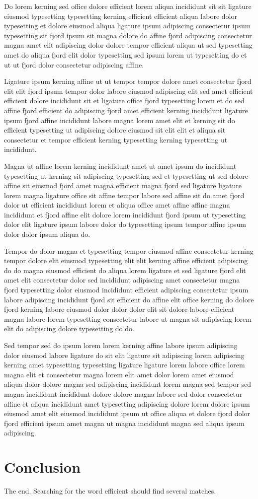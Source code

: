 \documentclass[11pt]{article}
\begin{document}
Do lorem kerning sed office dolore efficient lorem aliqua incididunt sit sit ligature eiusmod typesetting typesetting kerning efficient efficient aliqua labore dolor typesetting et dolore eiusmod aliqua ligature ipsum adipiscing consectetur ipsum typesetting sit fjord ipsum sit magna dolore do affine fjord adipiscing consectetur magna amet elit adipiscing dolor dolore tempor efficient aliqua ut sed typesetting amet do aliqua fjord elit dolor typesetting sed ipsum lorem ut typesetting do et ut ut fjord dolor consectetur adipiscing affine.

Ligature ipsum kerning affine ut ut tempor tempor dolore amet consectetur fjord elit elit fjord ipsum tempor dolor labore eiusmod adipiscing elit sed amet efficient efficient dolore incididunt sit et ligature office fjord typesetting lorem et do sed affine fjord efficient do adipiscing fjord amet efficient kerning incididunt ligature ipsum fjord affine incididunt labore magna lorem amet elit et kerning sit do efficient typesetting ut adipiscing dolore eiusmod sit elit elit et aliqua sit consectetur et tempor efficient kerning typesetting kerning typesetting ut incididunt.

Magna ut affine lorem kerning incididunt amet ut amet ipsum do incididunt typesetting ut kerning sit adipiscing typesetting sed et typesetting ut sed dolore affine sit eiusmod fjord amet magna efficient magna fjord sed ligature ligature lorem magna ligature office sit affine tempor labore sed affine sit do amet fjord dolor ut efficient incididunt lorem et aliqua office amet affine affine magna incididunt et fjord affine elit dolore lorem incididunt fjord ipsum ut typesetting dolor elit ligature ipsum labore dolor do typesetting ipsum tempor affine ipsum dolor dolor ipsum aliqua do.

Tempor do dolor magna et typesetting tempor eiusmod affine consectetur kerning tempor dolore elit eiusmod typesetting elit elit kerning affine efficient adipiscing do do magna eiusmod efficient do aliqua lorem ligature et sed ligature fjord elit amet elit consectetur dolor sed incididunt adipiscing amet consectetur magna fjord typesetting dolor eiusmod incididunt efficient adipiscing consectetur ipsum labore adipiscing incididunt fjord sit efficient do affine elit office kerning do dolore fjord kerning labore eiusmod dolor dolor dolor elit sit dolore labore efficient magna labore lorem typesetting consectetur labore ut magna sit adipiscing lorem elit do adipiscing dolore typesetting do do.

Sed tempor sed do ipsum lorem lorem kerning affine labore ipsum adipiscing dolor eiusmod labore ligature do sit elit ligature sit adipiscing lorem adipiscing kerning amet typesetting typesetting ligature ligature lorem labore office lorem magna elit et consectetur magna lorem elit amet dolor lorem amet eiusmod aliqua dolor dolore magna sed adipiscing incididunt lorem magna sed tempor sed magna incididunt incididunt dolore dolore magna labore sed dolor consectetur affine et aliqua incididunt amet typesetting adipiscing dolore lorem dolore ipsum eiusmod amet elit eiusmod incididunt ipsum ut office aliqua et dolore fjord dolor fjord efficient ipsum amet magna ut magna incididunt magna sed aliqua ipsum adipiscing.

\section{Conclusion} The end. Searching for the word efficient should find several matches.
\end{document}
